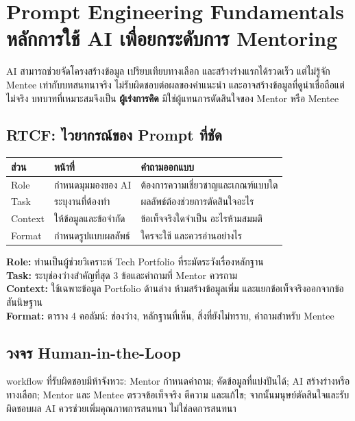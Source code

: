 \chapter{Prompt Engineering Fundamentals\\หลักการใช้ AI เพื่อยกระดับการ Mentoring}

AI สามารถช่วยจัดโครงสร้างข้อมูล เปรียบเทียบทางเลือก และสร้างร่างแรกได้รวดเร็ว แต่ไม่รู้จัก Mentee เท่ากับบทสนทนาจริง ไม่รับผิดชอบต่อผลของคำแนะนำ และอาจสร้างข้อมูลที่ดูน่าเชื่อถือแต่ไม่จริง บทบาทที่เหมาะสมจึงเป็น \textbf{ผู้เร่งการคิด} มิใช่ผู้แทนการตัดสินใจของ Mentor หรือ Mentee


\section{RTCF: ไวยากรณ์ของ Prompt ที่ชัด}
\begin{longtable}{P{.16\textwidth}P{.28\textwidth}P{.42\textwidth}}
\toprule
\textbf{ส่วน} & \textbf{หน้าที่} & \textbf{คำถามออกแบบ}\\
\midrule
Role & กำหนดมุมมองของ AI & ต้องการความเชี่ยวชาญและเกณฑ์แบบใด\\
Task & ระบุงานที่ต้องทำ & ผลลัพธ์ต้องช่วยการตัดสินใจอะไร\\
Context & ให้ข้อมูลและข้อจำกัด & ข้อเท็จจริงใดจำเป็น อะไรห้ามสมมติ\\
Format & กำหนดรูปแบบผลลัพธ์ & ใครจะใช้ และควรอ่านอย่างไร\\
\bottomrule
\end{longtable}

\begin{promptbox}
\textbf{Role:} ท่านเป็นผู้ช่วยวิเคราะห์ Tech Portfolio ที่ระมัดระวังเรื่องหลักฐาน\\
\textbf{Task:} ระบุช่องว่างสำคัญที่สุด 3 ข้อและคำถามที่ Mentor ควรถาม\\
\textbf{Context:} ใช้เฉพาะข้อมูล Portfolio ด้านล่าง ห้ามสร้างข้อมูลเพิ่ม และแยกข้อเท็จจริงออกจากข้อสันนิษฐาน\\
\textbf{Format:} ตาราง 4 คอลัมน์: ช่องว่าง, หลักฐานที่เห็น, สิ่งที่ยังไม่ทราบ, คำถามสำหรับ Mentee
\end{promptbox}

\section{วงจร Human-in-the-Loop}
workflow ที่รับผิดชอบมีห้าจังหวะ: Mentor กำหนดคำถาม; คัดข้อมูลที่แบ่งปันได้; AI สร้างร่างหรือทางเลือก; Mentor และ Mentee ตรวจข้อเท็จจริง ตีความ และแก้ไข; จากนั้นมนุษย์ตัดสินใจและรับผิดชอบผล AI ควรช่วยเพิ่มคุณภาพการสนทนา ไม่ใช่ลดการสนทนา

